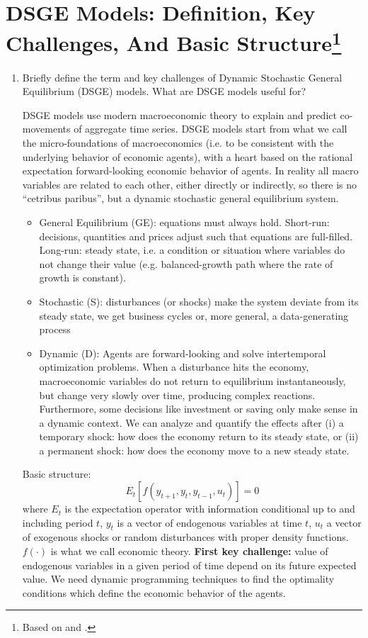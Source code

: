 \documentclass[a4paper]{scrartcl}
\begin{document}
\section[DSGE Models: Definition, Key Challenges, And Basic Structure]{DSGE Models: Definition, Key Challenges, And Basic Structure\footnote{Based on \citet[Ch.~1]{Torres.2015} and \citet{FVRRS.2016}.}}
\begin{enumerate}
	\item Briefly define the term and key challenges of Dynamic Stochastic General Equilibrium (DSGE) models. What are DSGE models useful for?
	\begin{solution}
	DSGE models use modern macroeconomic theory to explain and predict co-movements of aggregate time series. DSGE models start from what we call the micro-foundations of macroeconomics (i.e. to be consistent with the underlying behavior of economic agents), with a heart based on the rational expectation forward-looking economic behavior of agents. In reality all macro variables are related to each other, either directly or indirectly, so there is no \enquote{cetribus paribus}, but a dynamic stochastic general equilibrium system.
	\begin{itemize}
		\item General Equilibrium (GE): equations must always hold. Short-run: decisions, quantities and prices adjust such that equations are full-filled. Long-run: steady state, i.e. a condition or situation where variables do not change their value (e.g. balanced-growth path where the rate of growth is constant). 
		\item Stochastic (S): disturbances (or shocks) make the system deviate from its steady state, we get business cycles or, more general, a data-generating process
		\item Dynamic (D): Agents are forward-looking and solve intertemporal optimization problems. When a disturbance hits the economy, macroeconomic variables do not return to equilibrium instantaneously, but change very slowly over time, producing complex reactions. Furthermore, some decisions like investment or saving only make sense in a dynamic context. We can analyze and quantify the effects after (i) a temporary shock: how does the economy return to its steady state, or (ii) a permanent shock: how does the economy move to a new steady state.
	\end{itemize}
	Basic structure:
	$$ E_t \left[f(y_{t+1}, y_t, y_{t-1},u_t)\right]=0$$
	where $E_t$ is the expectation operator with information conditional up to and including period $t$, $y_t$ is a vector of endogenous variables at time $t$, $u_t$ a vector of exogenous shocks or random disturbances with proper density functions. $f(\cdot)$ is what we call economic theory. \textbf{First key challenge:} value of endogenous variables in a given period of time depend on its future expected value. We need dynamic programming techniques to find the optimality conditions which define the economic behavior of the agents.
	

\end{solution}
\end{enumerate}
\end{document}
